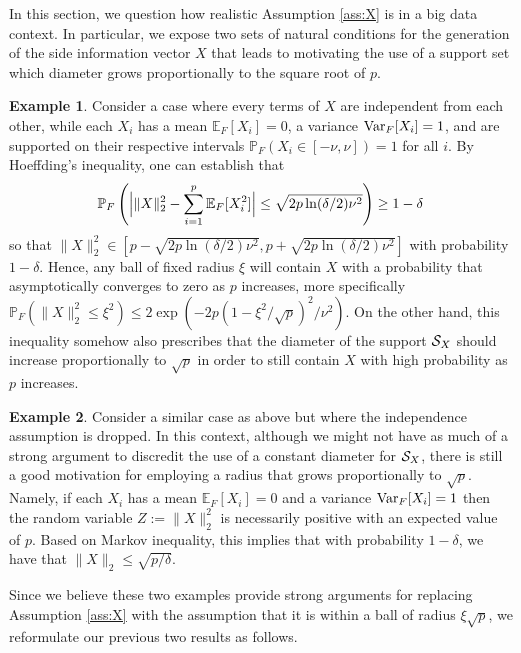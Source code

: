 \documentclass[]{interact}
\theoremstyle{plain}%
\theoremstyle{definition}
\theoremstyle{remark}
\def\Expect{{\mathbb E}}
\def\Prob{{\mathbb P}}
\newcommand{\0}{\V{0}}
\newcommand{\1}{\V{1}}
\newcommand{\modified}[1]{{\color{blue} #1}}
\def\Var{\mathop{\rm Var}}
\theoremstyle{plain}
\theoremstyle{definition}
\newtheorem*{ex}{Example}
\begin{document}
In this section, we question how realistic Assumption \ref{ass:X} is in a big data
context. In particular, we expose two sets of natural conditions for the generation of the
side information vector $X$ that leads to motivating the use of a support set which
diameter grows proportionally to the square root of $p$.

\begin{ex}
  Consider a case where every terms of $X$ are \modified{independent} from each other, while each
  $X_i$ has a mean $\Expect_F[X_i]=0$, a variance $\Var_F[X_i]=1$, and are supported on their
  respective intervals $\Prob_F(X_i\in [-\nu, \nu])=1$ for all $i$. By Hoeffding's
  inequality, one can establish that
  \[
    \Prob_F\left(\Bigl|\|X\|_2^2 - \sum_{i=1}^p \Expect_F[X_i^2]\Bigr| \leq
      \sqrt{2p\ln(\delta/2)\nu^2}\right) \geq 1-\delta
  \]
  so that
  $\|X\|_2^2 \in [p- \sqrt{2p\ln(\delta/2)\nu^2}, p+ \sqrt{2p\ln(\delta/2)\nu^2}]$ with
  probability $1-\delta$. Hence, any ball of fixed radius $\xi$ will contain $X$ with a
  probability that asymptotically converges to zero as $p$ increases, more specifically
  $\Prob_F(\|X\|_2^2\leq \xi^2)\leq 2\exp(-2p(1-\xi^2/\sqrt{p})^2/\nu^2)$. On the other hand,
  this inequality somehow also prescribes that the diameter of the support ${\mathcal{S}_X}$ should
  increase proportionally to $\sqrt{p}$ in order to still contain $X$ with high
  probability as $p$ increases.
\end{ex}

\begin{ex}
  Consider a similar case as above but where the independence assumption is dropped. In
  this context, although we might not have as much of a strong argument to discredit the
  use of a constant diameter for ${\mathcal{S}_X}$, there is still a good motivation for employing a
  radius that grows proportionally to $\sqrt{p}$. Namely, if each $X_i$ has a mean
  $\Expect_F[X_i]=0$ and a variance $\Var_F[X_i]=1$ then the random variable $Z:=\|X\|_2^2$ is
  necessarily positive with an expected value of $p$. Based on Markov inequality, this
  implies that with probability $1-\delta$, we have that $\|X\|_2\leq \sqrt{p/\delta}$.
\end{ex}

Since we believe these two examples provide strong arguments for replacing Assumption
\ref{ass:X} with the assumption that it is within a ball of radius $\xi\sqrt{p}$, we
reformulate our previous two results as follows.
\end{document}
